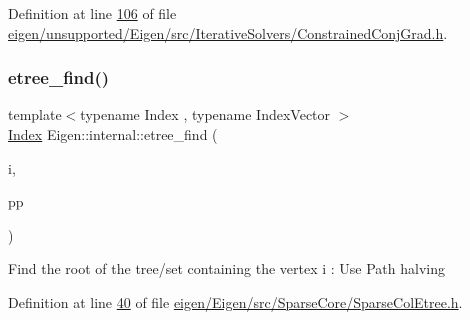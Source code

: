 Definition at line \hyperlink{eigen_2unsupported_2_eigen_2src_2_iterative_solvers_2_constrained_conj_grad_8h_source_l00106}{106} of file \hyperlink{eigen_2unsupported_2_eigen_2src_2_iterative_solvers_2_constrained_conj_grad_8h_source}{eigen/unsupported/\+Eigen/src/\+Iterative\+Solvers/\+Constrained\+Conj\+Grad.\+h}.

\mbox{\label{namespace_eigen_1_1internal_af1daa938f6414254cc9a754f1ef2490b}} 
\subsubsection{\texorpdfstring{etree\+\_\+find()}{etree\_find()}}
{\footnotesize\ttfamily template$<$typename Index , typename Index\+Vector $>$ \\
\hyperlink{namespace_eigen_a62e77e0933482dafde8fe197d9a2cfde}{Index} Eigen\+::internal\+::etree\+\_\+find (\begin{DoxyParamCaption}\item[{\hyperlink{namespace_eigen_a62e77e0933482dafde8fe197d9a2cfde}{Index}}]{i,  }\item[{Index\+Vector \&}]{pp }\end{DoxyParamCaption})}

Find the root of the tree/set containing the vertex i \+: Use Path halving 

Definition at line \hyperlink{eigen_2_eigen_2src_2_sparse_core_2_sparse_col_etree_8h_source_l00040}{40} of file \hyperlink{eigen_2_eigen_2src_2_sparse_core_2_sparse_col_etree_8h_source}{eigen/\+Eigen/src/\+Sparse\+Core/\+Sparse\+Col\+Etree.\+h}.

\mbox{\label{namespace_eigen_1_1internal_a851df31ae9133639a8eb3f6a8484bbf7}} 
